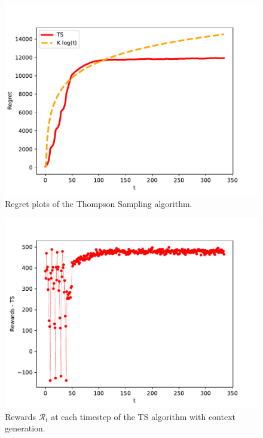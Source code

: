 \documentclass[12pt,a4paper]{report}
\begin{document}
\begin{figure}[H]
\centering
  \includegraphics[scale = 0.7, center]{5r}
  \caption{Regret plots of the Thompson Sampling algorithm.}
\end{figure}
\begin{figure}[H]
\centering
  \includegraphics[scale = 0.7, center]{5rew}
  \caption{Rewards $\mathcal R_t$ at each timestep of the TS algorithm with context generation.}
\end{figure}
\end{document}
